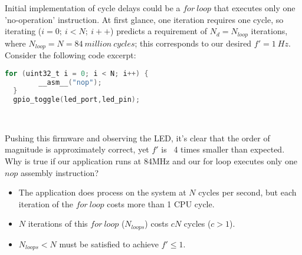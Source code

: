 \documentclass[a4paper,12pt]{article}   	%
\begin{document}
\large
\begin{flushleft}
Initial implementation of cycle delays could be a 
$for\ loop$ that executes only one 'no-operation' instruction. At first 
glance, one iteration requires one cycle, so iterating ($i = 0;\ i < N;\ i++$)
predicts a requirement of $N_d = N_{loop}$ iterations, where $N_{loop} = N = 84\ million\ cycles$;
this corresponds to our desired $f'= 1\ Hz$.\\[2 ex] 

Consider the following code excerpt:\\[1 ex] 

\begin{lstlisting}[backgroundcolor = \color{beige},
                    language = C,
                    xleftmargin = 2cm,
                    framexleftmargin = 1em]
  for (uint32_t i = 0; i < N; i++) {
        __asm__("nop");
  }
  gpio_toggle(led_port,led_pin);
  \end{lstlisting}

\

Pushing this firmware and
observing the LED, it's clear that the order of magnitude is approximately correct, 
yet $f'$ is ~4 times smaller than expected. Why is true 
if our application runs at 84MHz and our for loop executes only one $nop$ assembly instruction?\\[1 ex]

\end{flushleft}
\begin{itemize}
\setlength{\itemindent}{0.4in}
    \item The application does process on the system at $N$ cycles per second, 
    but each iteration of the $for\ loop$ costs more than 1 CPU cycle. 
    \item $N$ iterations of this $for\ loop$ ($N_{loops}$) costs $cN$ cycles ($c > 1$).
    \item $N_{loops} < N$ must be satisfied to achieve $f' \le 1.$
\end{itemize}
\end{document}
